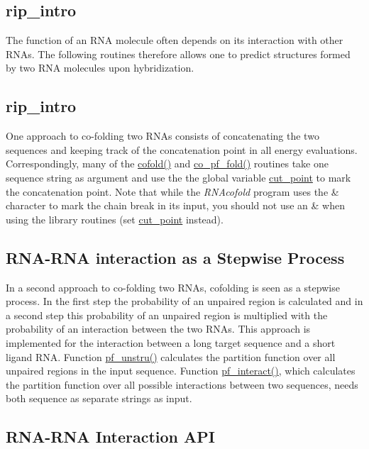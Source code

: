 \hypertarget{rip_rip_intro}{}\subsection{rip\+\_\+intro}\label{rip_rip_intro}
The function of an R\+NA molecule often depends on its interaction with other R\+N\+As. The following routines therefore allows one to predict structures formed by two R\+NA molecules upon hybridization.\hypertarget{rip_rip_intro}{}\subsection{rip\+\_\+intro}\label{rip_rip_intro}
One approach to co-\/folding two R\+N\+As consists of concatenating the two sequences and keeping track of the concatenation point in all energy evaluations. Correspondingly, many of the \hyperlink{group__mfe__cofold_gabc8517f22cfe70595ee81fc837910d52}{cofold()} and \hyperlink{part__func__co_8h_ae5c1e7331718669bdae7a86de2be6184}{co\+\_\+pf\+\_\+fold()} routines take one sequence string as argument and use the the global variable \hyperlink{fold__vars_8h_ab9b2c3a37a5516614c06d0ab54b97cda}{cut\+\_\+point} to mark the concatenation point. Note that while the {\itshape R\+N\+Acofold} program uses the \textquotesingle{}\&\textquotesingle{} character to mark the chain break in its input, you should not use an \textquotesingle{}\&\textquotesingle{} when using the library routines (set \hyperlink{fold__vars_8h_ab9b2c3a37a5516614c06d0ab54b97cda}{cut\+\_\+point} instead).\hypertarget{rip_rip_stepwise}{}\subsection{R\+N\+A-\/\+R\+N\+A interaction as a Stepwise Process}\label{rip_rip_stepwise}
In a second approach to co-\/folding two R\+N\+As, cofolding is seen as a stepwise process. In the first step the probability of an unpaired region is calculated and in a second step this probability of an unpaired region is multiplied with the probability of an interaction between the two R\+N\+As. This approach is implemented for the interaction between a long target sequence and a short ligand R\+NA. Function \hyperlink{group__up__cofold_ga5b4ee40e190d2f633cd01cf0d2fe93cf}{pf\+\_\+unstru()} calculates the partition function over all unpaired regions in the input sequence. Function \hyperlink{group__up__cofold_ga1aa0aa02bc3a724f87360c03097afd00}{pf\+\_\+interact()}, which calculates the partition function over all possible interactions between two sequences, needs both sequence as separate strings as input.\hypertarget{rip_rip_api}{}\subsection{R\+N\+A-\/\+R\+N\+A Interaction A\+PI}\label{rip_rip_api}
